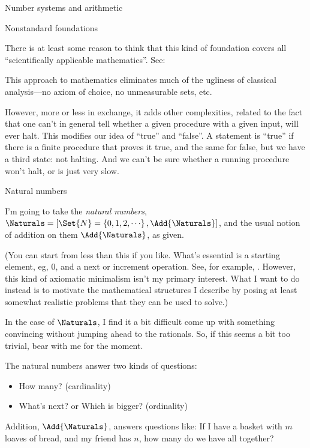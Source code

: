 \documentclass[12pt]{PalisadesLakesBook}
\begin{document}
\begin{plSection}{Number systems and arithmetic}
\begin{plSection}{Nonstandard foundations}
\begin{itemize}
There is at least some reason to think 
that this kind of foundation covers all ``scientifically
applicable mathematics''.
See:

This approach to mathematics eliminates much of the ugliness
of classical analysis---no axiom of choice, no unmeasurable
sets, etc.

However, more or less in exchange, it adds other complexities,
related to the fact that one can't in general tell whether a given
procedure with a given input, will ever halt.
This modifies our idea of ``true'' and ``false''.
A statement is ``true'' if there is a finite procedure that
proves it true, and the same for false,
but we have a third state: not halting. 
And we can't be sure whether a running procedure won't halt,
or is just very slow.

\end{itemize}

\end{plSection}%
\begin{plSection}{Natural numbers}

I'm going to take the \emph{natural numbers},
$\Naturals =
 [ \Set{N}=\left\{ 0, 1, 2, {\cdots}\right\}, \Add{\Naturals}]$,
and the usual notion of addition on them $\Add{\Naturals}$,
as given.

(You can start from less than this if you like.
What's essential is a starting element, eg, $0$,
and a {\pseudocodeFont next}
or {\pseudocodeFont increment} operation. 
See, for example, 
.
However, this kind of axiomatic minimalism 
isn't my primary interest.
What I want to do instead is to motivate the mathematical
structures I describe by posing at least somewhat realistic
problems that they can be used to solve.)

In the case of $\Naturals$, I find it a bit difficult 
come up with something convincing without
jumping ahead to the rationals.
So, if this seems a bit too trivial,
 bear with me for the moment.

The natural numbers answer two kinds of questions:
\begin{itemize}
\item How many? (cardinality)
\item What's next? or Which is bigger? (ordinality)
\end{itemize}

Addition, $\Add{\Naturals}$, answers questions like:
If I have a basket with $m$ loaves of bread,
and my friend has $n$, how many do we have all together?


\end{plSection}
\end{plSection}
\end{document}

